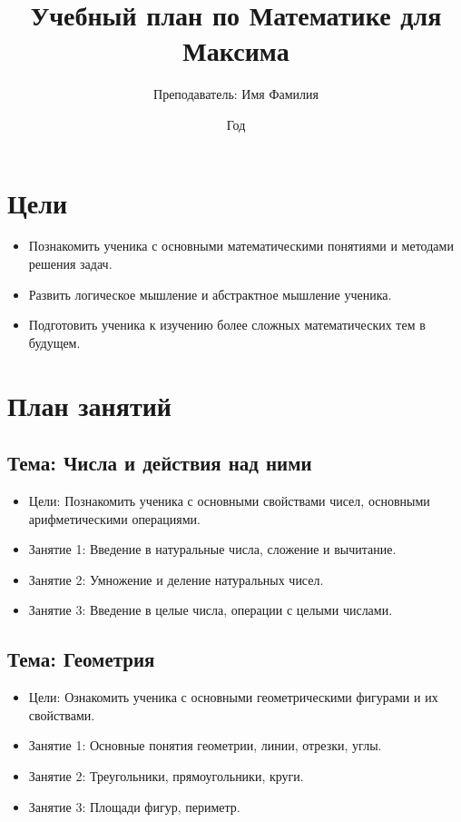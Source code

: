 \documentclass{article}
\begin{document}
\title{Учебный план по Математике для Максима}
\author{Преподаватель: Имя Фамилия}
\date{Год}

\maketitle

\section{Цели}
\begin{itemize}
    \item Познакомить ученика с основными математическими понятиями и методами решения задач.
    \item Развить логическое мышление и абстрактное мышление ученика.
    \item Подготовить ученика к изучению более сложных математических тем в будущем.
\end{itemize}

\section{План занятий}

\subsection{Тема: Числа и действия над ними}
\begin{itemize}
    \item Цели: Познакомить ученика с основными свойствами чисел, основными арифметическими операциями.
    \item Занятие 1: Введение в натуральные числа, сложение и вычитание.
    \item Занятие 2: Умножение и деление натуральных чисел.
    \item Занятие 3: Введение в целые числа, операции с целыми числами.
\end{itemize}

\subsection{Тема: Геометрия}
\begin{itemize}
    \item Цели: Ознакомить ученика с основными геометрическими фигурами и их свойствами.
    \item Занятие 1: Основные понятия геометрии, линии, отрезки, углы.
    \item Занятие 2: Треугольники, прямоугольники, круги.
    \item Занятие 3: Площади фигур, периметр.
\end{itemize}
\end{document}
